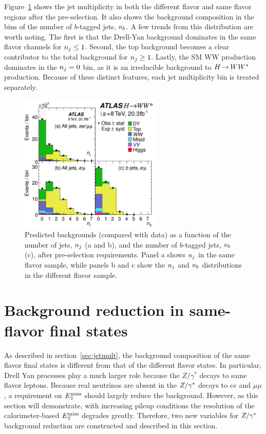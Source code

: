 Figure~\ref{fig:njet} shows the jet multiplicity in both the different flavor and same flavor regions after the pre-selection. It also shows the background composition in the bins of the number of $b$-tagged jets, $n_b$. A few trends from this distribution are worth noting. The first is that the Drell-Yan background dominates in the same flavor channels for $n_j \leq 1$. Second, the top background becomes a clear contributor to the total background for $n_j \geq 1$. Lastly, the SM WW production dominates in the $n_j = 0$ bin, as it is an irreducible background to $H{\,{\rightarrow}\,}WW^\ast$ production. Because of these distinct features, each jet multiplicity bin is treated separately.

\begin{figure}[h!]
  \centering
  \captionsetup{justification=centering}

  \includegraphics[width=0.6\textwidth]{figures/njet}
  \caption{Predicted backgrounds (compared with data) as a function of the number of jets, $n_j$ (a and b), and the number of $b$-tagged jets, $n_b$ (c), after pre-selection requirements. Panel a shows $n_j$ in the same flavor sample, while panels b and c show the $n_j$ and $n_b$ distributions in the different flavor sample.}
  \label{fig:njet}
\end{figure}

\section{Background reduction in same-flavor final states}
\label{sec:sameflavor}
As described in section~\ref{sec:jetmult}, the background composition of the same flavor final states is different from that of the different flavor states. In particular, Drell Yan processes play a much larger role because the $Z/\gamma^{*}$ decays to same flavor leptons. Because real neutrinos are absent in the $Z/\gamma^{\ast}$ decays to $ee$ and $\mu\mu$, a requirement on $E_{\textrm{\footnotesize\sc t}}^{\rm miss}$ should largely reduce the background. However, as this section will demonstrate, with increasing pileup conditions the resolution of the calorimeter-based $E_{\textrm{\footnotesize\sc t}}^{\rm miss}$ degrades greatly. Therefore, two new variables for $Z/\gamma^{\ast}$ background reduction are constructed and described in this section.

